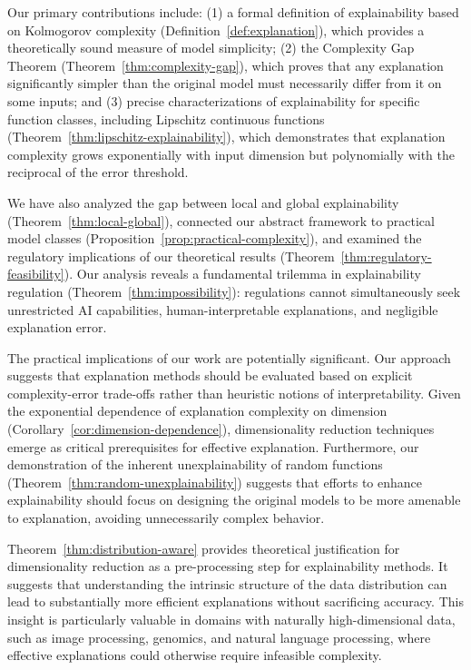 \documentclass[11pt,letter,leqno]{article}
\begin{document}
Our primary contributions include: (1) a formal definition of explainability based on Kolmogorov complexity (Definition~\ref{def:explanation}), which provides a theoretically sound measure of model simplicity; (2) the Complexity Gap Theorem (Theorem~\ref{thm:complexity-gap}), which proves that any explanation significantly simpler than the original model must necessarily differ from it on some inputs; and (3) precise characterizations of explainability for specific function classes, including Lipschitz continuous functions (Theorem~\ref{thm:lipschitz-explainability}), which demonstrates that explanation complexity grows exponentially with input dimension but polynomially with the reciprocal of the error threshold.

We have also analyzed the gap between local and global explainability (Theorem~\ref{thm:local-global}), connected our abstract framework to practical model classes (Proposition~\ref{prop:practical-complexity}), and examined the regulatory implications of our theoretical results (Theorem~\ref{thm:regulatory-feasibility}).  Our analysis reveals a fundamental trilemma in explainability regulation (Theorem~\ref{thm:impossibility}): regulations cannot simultaneously seek unrestricted AI capabilities, human-interpretable explanations, and negligible explanation error.

The practical implications of our work are potentially significant.  Our approach suggests that explanation methods should be evaluated based on explicit complexity-error trade-offs rather than heuristic notions of interpretability.  Given the exponential dependence of explanation complexity on dimension (Corollary~\ref{cor:dimension-dependence}), dimensionality reduction techniques emerge as critical prerequisites for effective explanation.  Furthermore, our demonstration of the inherent unexplainability of random functions (Theorem~\ref{thm:random-unexplainability}) suggests that efforts to enhance explainability should focus on designing the original models to be more amenable to explanation, avoiding unnecessarily complex behavior.

Theorem~\ref{thm:distribution-aware} provides theoretical justification for dimensionality reduction as a pre-processing step for explainability methods.  It suggests that understanding the intrinsic structure of the data distribution can lead to substantially more efficient explanations without sacrificing accuracy.  This insight is particularly valuable in domains with naturally high-dimensional data, such as image processing, genomics, and natural language processing, where effective explanations could otherwise require infeasible complexity.
\end{document}
